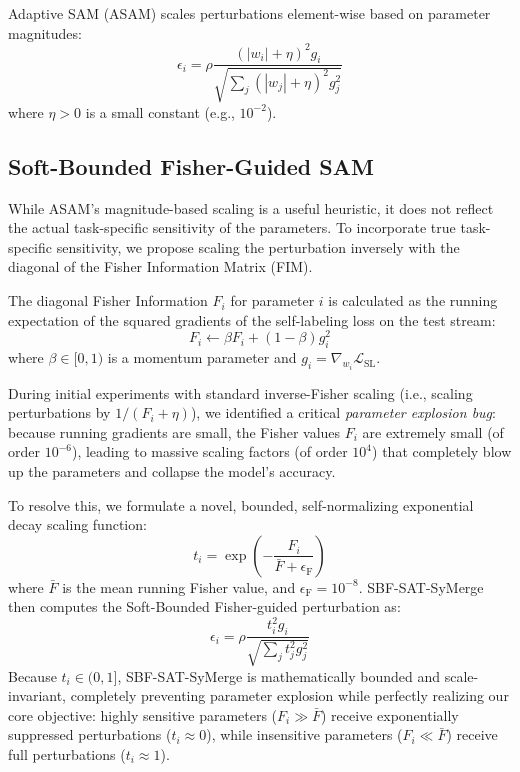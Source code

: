 \documentclass{article}
\theoremstyle{plain}
\theoremstyle{definition}
\theoremstyle{remark}
\begin{document}
Adaptive SAM (ASAM) \cite{kwon2021asam_1} scales perturbations element-wise based on parameter magnitudes:
$$\epsilon_i = \rho \frac{(|w_i| + \eta)^2 g_i}{\sqrt{\sum_j (|w_j| + \eta)^2 g_j^2}}$$
where $\eta > 0$ is a small constant (e.g., $10^{-2}$).

\subsection{Soft-Bounded Fisher-Guided SAM}
While ASAM's magnitude-based scaling is a useful heuristic, it does not reflect the actual task-specific sensitivity of the parameters. To incorporate true task-specific sensitivity, we propose scaling the perturbation inversely with the diagonal of the Fisher Information Matrix (FIM). 

The diagonal Fisher Information $F_i$ for parameter $i$ is calculated as the running expectation of the squared gradients of the self-labeling loss on the test stream:
$$F_i \leftarrow \beta F_i + (1 - \beta) g_i^2$$
where $\beta \in [0, 1)$ is a momentum parameter and $g_i = \nabla_{w_i} \mathcal{L}_{\text{SL}}$.

During initial experiments with standard inverse-Fisher scaling (i.e., scaling perturbations by $1 / (F_i + \eta)$), we identified a critical \textit{parameter explosion bug}: because running gradients are small, the Fisher values $F_i$ are extremely small (of order $10^{-6}$), leading to massive scaling factors (of order $10^4$) that completely blow up the parameters and collapse the model's accuracy.

To resolve this, we formulate a novel, bounded, self-normalizing exponential decay scaling function:
$$t_i = \exp\left( - \frac{F_i}{\bar{F} + \epsilon_{\text{F}}} \right)$$
where $\bar{F}$ is the mean running Fisher value, and $\epsilon_{\text{F}} = 10^{-8}$. SBF-SAT-SyMerge then computes the Soft-Bounded Fisher-guided perturbation as:
$$\epsilon_i = \rho \frac{t_i^2 g_i}{\sqrt{\sum_j t_j^2 g_j^2}}$$
Because $t_i \in (0, 1]$, SBF-SAT-SyMerge is mathematically bounded and scale-invariant, completely preventing parameter explosion while perfectly realizing our core objective: highly sensitive parameters ($F_i \gg \bar{F}$) receive exponentially suppressed perturbations ($t_i \approx 0$), while insensitive parameters ($F_i \ll \bar{F}$) receive full perturbations ($t_i \approx 1$).
\end{document}
